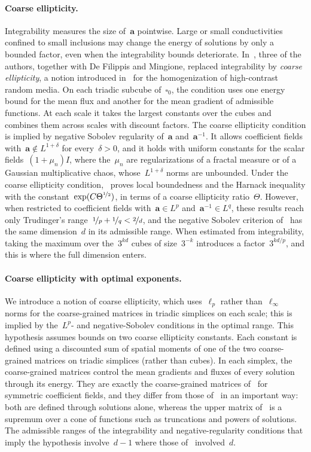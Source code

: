 \documentclass[11pt,letterpaper]{article}
\numberwithin{equation}{section}
\theoremstyle{definition}
\renewcommand{\a}{\mathbf{a}}
\newcommand{\nf}{\nicefrac}
\newcommand{\cu}{\square}
\begin{document}
\paragraph{Coarse ellipticity.} Integrability measures the size of~$\a$ pointwise. 
Large or small conductivities confined to small inclusions may change the energy of solutions by only a bounded factor, even when the integrability bounds deteriorate.
In~\cite{AADKM}, three of the authors, together with De Filippis and Mingione, replaced integrability by \emph{coarse ellipticity}, a notion introduced in~\cite{AK.HC} for the homogenization of high-contrast random media. On each triadic subcube of~$\cu_0$, the condition uses one energy bound for the mean flux and another for the mean gradient of admissible functions. At each scale it takes the largest constants over the cubes and combines them across scales with discount factors. The coarse ellipticity condition is implied by negative Sobolev regularity of~$\a$ and~$\a^{-1}$. It allows coefficient fields with~$\a\notin L^{1+\delta}$ for every~$\delta>0$, and it holds with uniform constants for the scalar fields~$(1+\mu_n)I$, where the~$\mu_n$ are regularizations of a fractal measure or of a Gaussian multiplicative chaos, whose~$L^{1+\delta}$ norms are unbounded. Under the coarse ellipticity condition,~\cite{AADKM} proves local boundedness and the Harnack inequality with the constant~$\exp(C\Theta^{\nf12})$, in terms of a coarse ellipticity ratio~$\Theta$. However, when restricted to coefficient fields with~$\a\in L^p$ and~$\a^{-1}\in L^q$, these results reach only Trudinger's range~$\nf1p+\nf1q<\nf2d$, and the negative Sobolev criterion of~\cite{AADKM} has the same dimension~$d$ in its admissible range. When estimated from integrability, taking the maximum over the~$3^{kd}$ cubes of size~$3^{-k}$ introduces a factor~$3^{kd/p}$, and this is where the full dimension enters.

\paragraph{Coarse ellipticity with optimal exponents.} 
We introduce a notion of coarse ellipticity, which uses~$\ell_p$ rather than~$\ell_\infty$ norms for the coarse-grained matrices in triadic simplices on each scale; this is implied by the~$L^p$- and negative-Sobolev conditions in the optimal range. This hypothesis assumes bounds on two coarse ellipticity constants. Each constant is defined using a discounted sum of spatial moments of one of the two coarse-grained matrices on triadic simplices (rather than cubes). In each simplex, the coarse-grained matrices control the mean gradients and fluxes of every solution through its energy. They are exactly the coarse-grained matrices of~\cite{AK.HC} for symmetric coefficient fields, and they differ from those of~\cite{AADKM} in an important way: both are defined through solutions alone, whereas the upper matrix of~\cite{AADKM} is a supremum over a cone of functions such as truncations and powers of solutions. The admissible ranges of the integrability and negative-regularity conditions that imply the hypothesis involve~$d-1$ where those of~\cite{AADKM} involved~$d$. 
\end{document}
